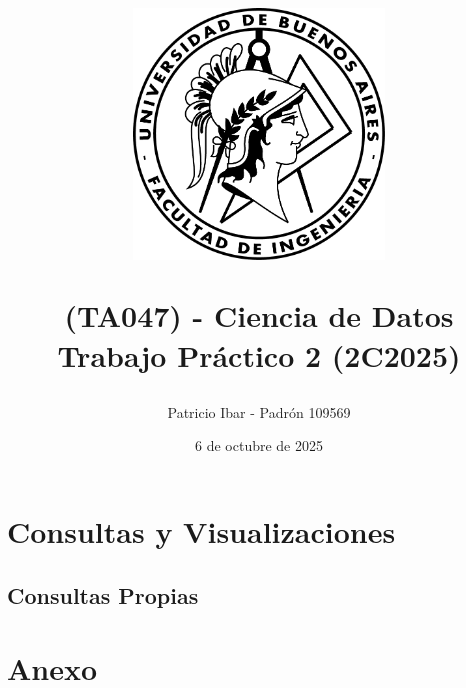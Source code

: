 \documentclass{article}
\title{
    \includegraphics[width=0.5\textwidth]
    {imagenes/Logo-fiuba.png}

    \vspace{1cm}
    \textbf{(TA047) - Ciencia de Datos} \\
    \vspace{1cm}
    \textbf{Trabajo Práctico 2 (2C2025)}
}
\author{Patricio Ibar - Padrón 109569}
\date{6 de octubre de 2025}
\begin{document}
    
    \maketitle
    \newpage

    \tableofcontents
    \newpage

    

    

    \newpage
    \section{Consultas y Visualizaciones}
    

    \subsection{Consultas Propias}
    

    \newpage
    \section{Anexo}
    
    
\end{document}
